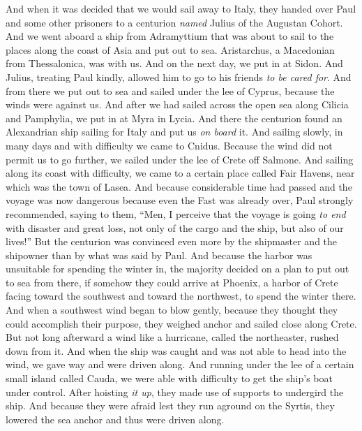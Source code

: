 \begin{biblechapter} %
 And when it was decided that we would sail away to Italy, they handed over Paul and some other prisoners to a centurion \textit{named} Julius of the Augustan Cohort.
\verse And we went aboard a ship from Adramyttium that was about to sail to the places along the coast of Asia and put out to sea. Aristarchus, a Macedonian from Thessalonica, was with us.
\verse And on the next day, we put in at Sidon. And Julius, treating Paul kindly, allowed him to go to his friends \textit{to be cared for}.
\verse And from there we put out to sea and sailed under the lee of Cyprus, because the winds were against us.
\verse And after we had sailed across the open sea along Cilicia and Pamphylia, we put in at Myra in Lycia.
\verse And there the centurion found an Alexandrian ship sailing for Italy and put us \textit{on board} it.
\verse And sailing slowly, in many days and with difficulty we came to Cnidus. Because the wind did not permit us to go further, we sailed under the lee of Crete off Salmone.
\verse And sailing along its coast with difficulty, we came to a certain place called Fair Havens, near which was the town of Lasea.
\verse And because considerable time had passed and the voyage was now dangerous because even the Fast was already over, Paul strongly recommended,
\verse saying to them, “Men, I perceive that the voyage is going \textit{to end} with disaster and great loss, not only of the cargo and the ship, but also of our lives!”
\verse But the centurion was convinced even more by the shipmaster and the shipowner than by what was said by Paul.
\verse And because the harbor was unsuitable for spending the winter in, the majority decided on a plan to put out to sea from there, if somehow they could arrive at Phoenix, a harbor of Crete facing toward the southwest and toward the northwest, to spend the winter there.
 And when a southwest wind began to blow gently, because they thought they could accomplish their purpose, they weighed anchor and sailed close along Crete.
\verse But not long afterward a wind like a hurricane, called the northeaster, rushed down from it.
\verse And when the ship was caught and was not able to head into the wind, we gave way and were driven along.
\verse And running under the lee of a certain small island called Cauda, we were able with difficulty to get the ship’s boat under control.
\verse After hoisting \textit{it up}, they made use of supports to undergird the ship. And because they were afraid lest they run aground on the Syrtis, they lowered the sea anchor and thus were driven along.

\end{biblechapter}

